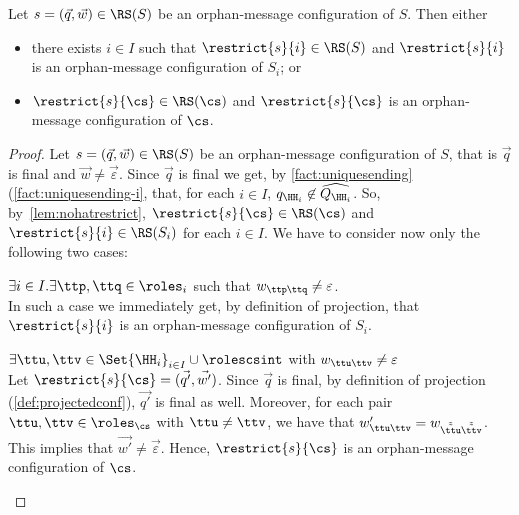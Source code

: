 \begin{lemma}%
\label{lem:restrRSom}
Let $s= (\vec{q},\vec{w}) \in \RS(S)$ be an orphan-message configuration of $S$.
Then either
\begin{itemize}
\item
 there exists $i\in I$ such that $\restrict{s}{i}\in \RS(S)$ and $\restrict{s}{i}$ is an  orphan-message configuration of $S_i$;
or 
\item
$\restrict{s}{\cs}\in \RS(\cs)$ and $\restrict{s}{\cs}$ is an  orphan-message configuration of $\cs$.
\end{itemize}
\end{lemma}

\begin{proof}
Let $s= (\vec{q},\vec{w}) \in \RS(S)$ be an orphan-message configuration of $S$, 
that is $\vec{q}$ is final and $\vec{w}\neq \vec{\varepsilon}$.
Since $\vec{q}$ is final we get, by  \cref{fact:uniquesending}(\ref{fact:uniquesending-i},  that, 
for each $i\in I$, $q_{\HH_i}\not\in \widehat{Q_{\HH_i}}$.
So, by~\cref{lem:nohatrestrict}, $\restrict{s}{\cs}\in \RS(\cs)$
and $\restrict{s}{i}\in \RS(S_i)$ for each $i\in I$. 
We have to consider now only the following two cases:
\begin{description}
\item
$\exists i\in I.\exists \ttp,\ttq\in \roles_i$ such that  $w_{\ttp\ttq}\neq\varepsilon$.\\
In such a case we immediately get, by definition of projection, that $\restrict{s}{i}$ is an  orphan-message configuration of $S_i$.
\item
$\exists \ttu,\ttv\in \Set{\HH_i}_{i\in I} \cup \rolescsint$ with  $w_{\ttu\ttv}\neq\varepsilon$ \\
Let $\restrict{s}{\cs}=({\vec{q'}},{\vec{w'}})$. Since $\vec{q}$ is final,
by definition of projection (\cref{def:projectedconf}), $\vec{q'}$ is final as well.
Moreover, for each pair $\ttu,\ttv\in \roles_{\cs}$ with $\ttu\neq\ttv$, 
we have that $w'_{\ttu\ttv} = w_{\tilde{\tilde{\ttu}}\tilde{\tilde{\ttv}}}$.
This implies that $\vec{w'}\neq \vec{\varepsilon}$.
Hence, $\restrict{s}{\cs}$ is an orphan-message configuration of $\cs$.
\end{description}


\end{proof}
